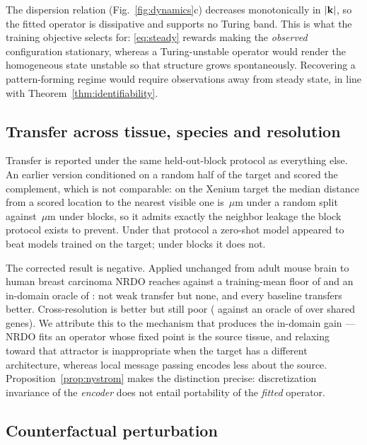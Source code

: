 The dispersion relation (Fig.~\ref{fig:dynamics}c) decreases monotonically in
$|\mathbf{k}|$, so the fitted operator is dissipative and supports no Turing band. This
is what the training objective selects for: \eqref{eq:steady} rewards making the
\emph{observed} configuration stationary, whereas a Turing-unstable operator
would render the homogeneous state unstable so that structure grows
spontaneously. Recovering a pattern-forming regime would require observations
away from steady state, in line with Theorem~\ref{thm:identifiability}.

\subsection{Transfer across tissue, species and resolution}

Transfer is reported under the same held-out-block protocol as everything else.
An earlier version conditioned on a random half of the target and scored the
complement, which is not comparable: on the Xenium target the median distance
from a scored location to the nearest visible one is \SplitXenRandom\,$\mu$m
under a random split against \SplitXenBlock\,$\mu$m under blocks, so it admits
exactly the neighbor leakage the block protocol exists to prevent. Under that
protocol a zero-shot model appeared to beat models trained on the target; under
blocks it does not.

The corrected result is negative. Applied unchanged from adult mouse brain to
human breast carcinoma NRDO reaches \TissueZeroShot{} against a training-mean
floor of \TissueFloor{} and an in-domain oracle of \TissueOracle{}: not weak
transfer but none, and every baseline transfers better. Cross-resolution is
better but still poor (\ResZeroShot{} against an oracle of \ResOracle{} over
\ResSharedGenes{} shared genes). We attribute this to the mechanism that produces
the in-domain gain --- NRDO fits an operator whose fixed point is the source
tissue, and relaxing toward that attractor is inappropriate when the target has a
different architecture, whereas local message passing encodes less about the
source. Proposition~\ref{prop:nystrom} makes the distinction precise:
discretization invariance of the \emph{encoder} does not entail portability of
the \emph{fitted} operator.

\subsection{Counterfactual perturbation}
\label{sec:results4}

